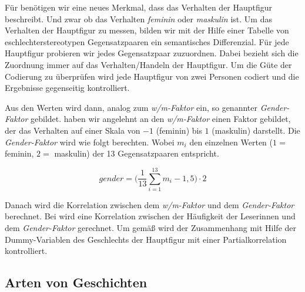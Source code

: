 Für  benötigen wir eine neues Merkmal, dass das Verhalten der
Hauptfigur beschreibt. Und zwar ob das Verhalten \emph{feminin} oder
\emph{maskulin} ist. Um das Verhalten der Hauptfigur zu messen, bilden
wir mit der Hilfe einer Tabelle von eschlechterstereotypen
Gegensatzpaaren ein semantisches Differenzial.
\parencites[174\psq]{feldmann2006}[93\psqq]{Spillner1974} Für jede
Hauptfigur probieren wir jedes Gegensatzpaar zuzuordnen. Dabei bezieht
sich die Zuordnung immer auf das Verhalten/Handeln der Hauptfigur. Um
die Güte der Codierung zu überprüfen wird jede Hauptfigur von zwei
Personen codiert und die Ergebnisse gegenseitig kontrolliert.



Aus den Werten wird dann, analog zum \emph{w/m-Faktor} ein, so genannter
\emph{Gender-Faktor} gebildet. haben wir angelehnt an den
\emph{w/m-Faktor} einen Faktor gebildet, der das Verhalten auf einer
Skala von $-1$ (feminin) bis $1$ (maskulin) darstellt. Die
\emph{Gender-Faktor} wird wie folgt berechten. Wobei $m_i$ den einzelnen
Werten ($1=$ feminin, $2=$ maskulin) der 13 Gegensatzpaaren entspricht.

\begin{equation}
    gender=\Bigg(\frac{1}{13}\sum_{i=1}^{13}m_i-1{,}5\Bigg)\cdot 2
\end{equation}

Danach wird die Korrelation zwischen dem \emph{w/m-Faktor} und dem
\emph{Gender-Faktor} berechnet. Bei  wird eine Korrelation
zwischen der Häufigkeit der Leserinnen und dem \emph{Gender-Faktor}
gerechnet. Um gemäß  wird der Zusammenhang mit Hilfe der
Dummy-Variablen des Geschlechts der Hauptfigur mit einer
Partialkorrelation kontrolliert.

\subsection{Arten von Geschichten}

